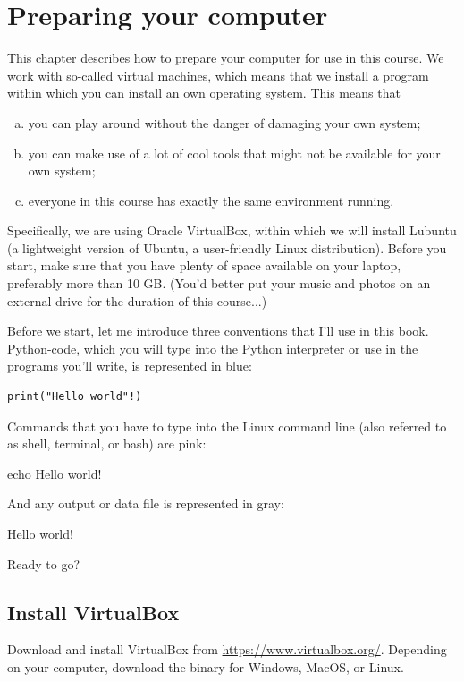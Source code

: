 \documentclass[a4paper,12pt]{book}
\begin{document}
\mainmatter


\chapter{Preparing your computer}
\label{chap:prepare}

This chapter describes how to prepare your computer for use in this course. We work with so-called virtual machines, which means that we install a program within which you can install an own operating system. This means that
\begin{enumerate}[(a)] 
\item you can play around without the danger of damaging your own system;
\item you can make use of a lot of cool tools that might not be available for your own system;
\item everyone in this course has exactly the same environment running.
\end{enumerate}

Specifically, we are using Oracle VirtualBox, within which we will install Lubuntu (a lightweight version of Ubuntu, a user-friendly Linux distribution). Before you start, make sure that you have plenty of space available on your laptop, preferably more than 10 GB. (You'd better put your music and photos on an external drive for the duration of this course...)

Before we start, let me introduce three conventions that I'll use in this book. Python-code, which you will type into the Python interpreter or use in the programs you'll write, is represented in blue:
\begin{lstlisting}
print("Hello world"!)
\end{lstlisting}
Commands that you have to type into the Linux command line (also referred to as shell, terminal, or bash) are pink:
\begin{lstlistingbash}
echo Hello world!
\end{lstlistingbash}
And any output or data file is represented in gray:
\begin{lstlistingoutput}
Hello world!
\end{lstlistingoutput}

Ready to go?



\section{Install VirtualBox}
Download and install VirtualBox from \url{https://www.virtualbox.org/}. Depending on your computer, download the binary for Windows, MacOS, or Linux.
\end{document}
